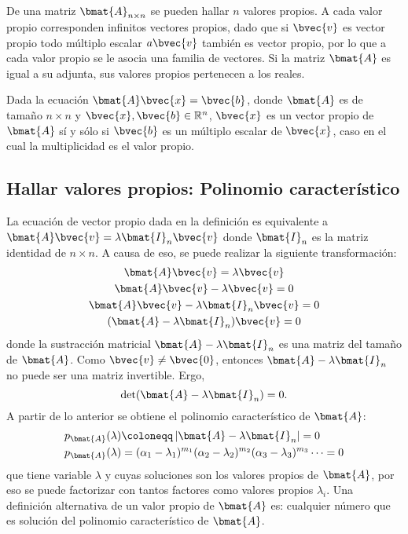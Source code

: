 \documentclass{fmbnotes}
\begin{document}
De una matriz \(\bmat{A}_{n \times n} \) se pueden hallar \( n \) valores propios. A cada valor propio corresponden infinitos vectores propios, dado que si \( \bvec{v} \) es vector propio todo múltiplo escalar \( a \bvec{v} \) también es vector propio, por lo que a cada valor propio se le asocia una familia de vectores. Si la matriz \( \bmat{A} \) es igual a su adjunta, sus valores propios pertenecen a los reales.


Dada la ecuación \(\bmat{A}\bvec{x}=\bvec{b}\), donde \(\bmat{A}\) es de tamaño \(n \times n \) y \(\bvec{x},\bvec{b} \in \mathbb{R}^{n}\), \(\bvec{x}\) es un vector propio de \(\bmat{A}\) sí y sólo si \(\bvec{b}\) es un múltiplo escalar de \(\bvec{x}\), caso en el cual la multiplicidad es el valor propio.

\subsection{Hallar valores propios: Polinomio característico}
La ecuación de vector propio dada en la definición es equivalente a \( \bmat{A} \bvec{v}=\lambda \bmat{I}_n \bvec{v} \) donde \( \bmat{I}_n \) es la matriz identidad de \(n\times n\). A causa de eso, se puede realizar la siguiente transformación:
\begin{gather*}
\bmat{A} \bvec{v} =\lambda \bvec{v} \\
\bmat{A} \bvec{v} - \lambda \bvec{v} =0 \\
\bmat{A} \bvec{v} -\lambda \bmat{I}_n \bvec{v} = 0\\
(\bmat{A}-\lambda \bmat{I}_n) \bvec{v}=0
\end{gather*}
donde la sustracción matricial \(\bmat{A}-\lambda \bmat{I}_n\) es una matriz del tamaño de \(\bmat{A}\). Como \(\bvec{v}\neq\bvec{0}\), entonces \(\bmat{A}-\lambda \bmat{I}_n\) no puede ser una matriz invertible. Ergo,
\[\det(\bmat{A}-\lambda \bmat{I}_n)=0.\]
A partir de lo anterior se obtiene el polinomio característico de \( \bmat{A} \):
\begin{align*}
	p_{\bmat{A}}(\lambda) & \coloneqq \left|\bmat{A}-\lambda \bmat{I}_n\right|=0 \\
	p_{\bmat{A}}(\lambda) & = (\alpha_1-\lambda_1)^{m_1}(\alpha_2-\lambda_2)^{m_2}(\alpha_3-\lambda_3)^{m_3}\cdots=0
\end{align*}
que tiene variable \(\lambda\) y cuyas soluciones son los valores propios de \(\bmat{A}\), por eso se puede factorizar con tantos factores como valores propios \(\lambda_i\). Una definición alternativa de un valor propio de \(\bmat{A}\) es: cualquier número que es solución del polinomio característico de \(\bmat{A}\). 
\end{document}
